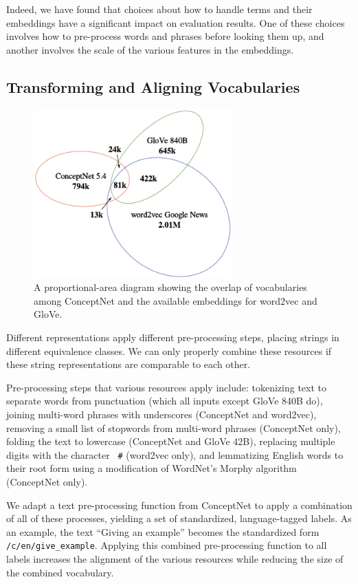 \documentclass[11pt,letterpaper]{article}
\begin{document}
Indeed, we have found that choices about how to handle terms and their
embeddings have a significant impact on evaluation results. One of these choices
involves how to pre-process words and phrases before looking them up, and
another involves the scale of the various features in the embeddings.


\subsection{Transforming and Aligning Vocabularies}
\label{standardizing-text}

\begin{figure}
\centering
\includegraphics[width=3.0in]{areas.pdf}
\caption{
    A proportional-area diagram showing the overlap of vocabularies among
    ConceptNet and the available embeddings for word2vec and GloVe.
}
\label{vocabulary-overlap}
\end{figure}

Different representations apply
different pre-processing steps, placing strings in different equivalence
classes. We can only properly combine these resources if these string
representations are comparable to each other.

Pre-processing steps that various resources apply include: tokenizing text to
separate words from punctuation (which all inputs except GloVe 840B do),
joining multi-word phrases with underscores (ConceptNet and word2vec), removing
a small list of stopwords from multi-word phrases (ConceptNet only), folding the text to lowercase
(ConceptNet and GloVe 42B), replacing multiple digits with the character {\tt
\#} (word2vec only), and lemmatizing English words to their root form using a
modification of WordNet's Morphy algorithm (ConceptNet only).

We adapt a text pre-processing function from ConceptNet to apply a combination
of all of these processes, yielding a set of standardized, language-tagged
labels. As an example, the text ``Giving an example'' becomes the standardized
form {\tt /c/en/give\_example}. Applying this combined pre-processing function
to all labels increases the alignment of the various resources while reducing
the size of the combined vocabulary.
\end{document}
